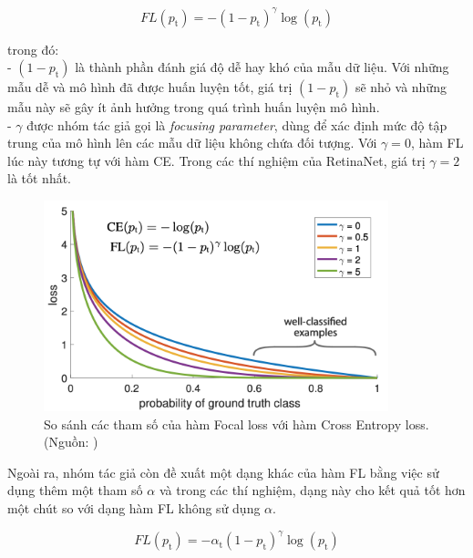 {    \begin{equation}
        FL(p_\textrm{t}) = - (1 - p_\textrm{t})^\gamma \log (p_\textrm{t})
    \end{equation}

    \noindent
    trong đó: \\
    - $(1 - p_\textrm{t})$ là thành phần đánh giá độ dễ hay khó của mẫu dữ liệu.
    Với những mẫu dễ và mô hình đã được huấn luyện tốt, giá trị $(1 - p_\textrm{t})$ sẽ nhỏ và những mẫu này sẽ gây ít ảnh hưởng trong quá trình huấn luyện mô hình. \\
    - $\gamma$ được nhóm tác giả gọi là \textit{focusing parameter}, dùng để xác định mức độ tập trung của mô hình lên các mẫu dữ liệu không chứa đối tượng.
    Với $\gamma = 0$, hàm FL lúc này tương tự với hàm CE.
    Trong các thí nghiệm của RetinaNet, giá trị $\gamma = 2$ là tốt nhất.

    \begin{figure}[H]
        \centering
        \includegraphics[width=10cm] {images/retinanet_focal_loss_curve}
        \caption{So sánh các tham số của hàm Focal loss  với hàm Cross Entropy loss. (Nguồn: \cite{lin2017focal})}
        \label{fig:retinanet_focal_loss_curve}
    \end{figure}

    \noindent
    Ngoài ra, nhóm tác giả còn đề xuất một dạng khác của hàm FL bằng việc sử dụng thêm một tham số $\alpha$ và trong các thí nghiệm, dạng này cho kết quả tốt hơn một chút so với dạng hàm FL không sử dụng $\alpha$.

    \begin{equation}
        FL(p_\textrm{t}) = - \alpha_\textrm{t} (1 - p_\textrm{t})^\gamma \log (p_\textrm{t})
    \end{equation}
    
}
